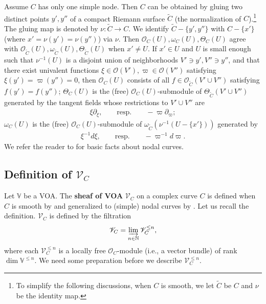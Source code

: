 \documentclass[12pt,a4paper,notitlepage]{article}
\theoremstyle{definition}
\theoremstyle{plain}
\newcommand{\wtd}{\widetilde}
\newcommand{\scr}{\mathscr}
\newcommand{\Vbb}{\mathbb V}
\newcommand{\Nbb}{\mathbb N}
\numberwithin{equation}{section}
\begin{document}
Assume $C$ has only one simple node. Then $C$ can be obtained by gluing two distinct points $y',y''$ of a compact Riemann surface $\wtd C$ (the normalization of $C$).\footnote{To simplify the following discussions, when $C$ is smooth, we let $\wtd C$ be $C$ and $\nu$ be the identity map.} The gluing map is denoted by $\nu:\wtd C\rightarrow C$. We identify $\wtd C-\{y',y''\}$ with $C-\{x'\}$ (where $x'=\nu(y')=\nu(y'')$) via $\nu$. Then  $\scr O_C(U),\omega_C(U),\Theta_C(U)$ agree with $\scr O_{\wtd C}(U),\omega_{\wtd C}(U),\Theta_{\wtd C}(U)$ when $x'\neq U$. If $x'\in U$ and $U$ is small enough such that $\nu^{-1}(U)$ is a disjoint union of neighborhoods $V'\ni y',V''\ni y''$, and that there exist univalent functions $\xi\in\scr O(V'),\varpi\in\scr O(V'')$ satisfying $\xi(y')=\varpi(y'')=0$, then $\scr O_C(U)$ consists of all $f\in\scr O_{\wtd C}(V'\cup V'')$ satisfying $f(y')=f(y'')$; $\Theta_C(U)$ is the (free) $\scr O_C(U)$-submodule of $\Theta_{\wtd C}(V'\cup V'')$ generated by the tangent fields whose restrictions to $V'\cup V''$ are 
\begin{align}
\xi\partial_\xi,\qquad \text{resp.}\qquad -\varpi\partial_\varpi;\label{eq9}
\end{align}   
$\omega_C(U)$ is the (free) $\scr O_C(U)$-submodule of $\omega_{\wtd C}(\nu^{-1}(U-\{x'\}))$ generated by
\begin{align*}
\xi^{-1}d\xi,\qquad \text{resp.}\qquad -\varpi^{-1}d\varpi.
\end{align*}  
We refer the reader to \cite[Chap.X]{ACG11} for  basic facts about nodal curves.




\subsection*{Definition of $\scr V_C$}


Let $\Vbb$ be a VOA. The \textbf{sheaf of VOA} $\scr V_C$ on a complex curve $C$ is defined when $C$ is smooth by \cite{FB04} and generalized to (simple) nodal curves by \cite{DGT19a}. Let us recall the definition.\index{VC@$\scr V_C,\scr V_C^{\leq n}$} $\scr V_C$ is defined by the filtration
\begin{align*}
\scr V_C=\varinjlim_{n\in\Nbb}\scr V_C^{\leq n},
\end{align*}
where each $\scr V_C^{\leq n}$ is a  locally free $\scr O_C$-module (i.e., a vector bundle) of rank $\dim\Vbb^{\leq n}$. We need some preparation before we describe $\scr V_C^{\leq n}$.
\end{document}

